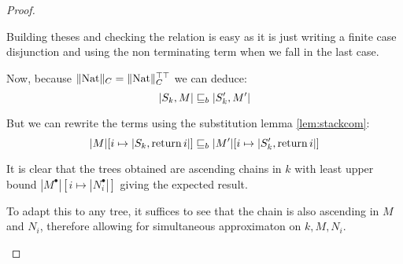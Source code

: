 \begin{ensps}
\begin{proof}
\begin{itemize}
            Building theses and checking the relation is easy as it is just 
            writing a finite case disjunction and using the non terminating 
            term when we fall in the last case.

            Now, because $\| \textnormal{Nat} \|_C = \| \textnormal{Nat} \|_C^{\top\top}$ we can 
            deduce:
            \begin{equation*}
                |S_k, M| \sqsubseteq_b |S_k', M'|
            \end{equation*}

            But we can rewrite the terms using the substitution lemma
            \ref{lem:stackcom}: 
            \begin{equation*}
                |M|[i \mapsto |S_k, \operatorname{return} i|] \sqsubseteq_b |M'|[ i \mapsto |S_k', \operatorname{return}
                i|]
            \end{equation*}

            It is clear that the trees obtained are ascending chains in $k$
            with least upper bound $|M^\bullet|[i \mapsto |N_i^\bullet|]$ 
            giving the expected result.

            To adapt this to any tree, it suffices to see that the chain 
            is also ascending in $M$ and $N_i$, therefore allowing for 
            simultaneous approximaton on $k,M,N_i$.
    \end{itemize} 

\end{proof}
\end{ensps}
